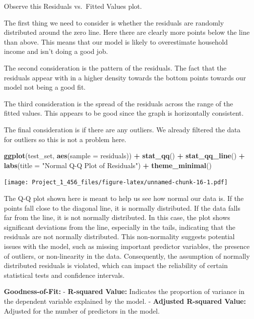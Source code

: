 \documentclass[
]{article}
\newenvironment{Shaded}{\begin{snugshade}}{\end{snugshade}}
\newcommand{\AttributeTok}[1]{\textcolor[rgb]{0.13,0.29,0.53}{#1}}
\newcommand{\FunctionTok}[1]{\textcolor[rgb]{0.13,0.29,0.53}{\textbf{#1}}}
\newcommand{\NormalTok}[1]{#1}
\newcommand{\SpecialCharTok}[1]{\textcolor[rgb]{0.81,0.36,0.00}{\textbf{#1}}}
\newcommand{\StringTok}[1]{\textcolor[rgb]{0.31,0.60,0.02}{#1}}
\begin{document}
Observe this Residuals vs.~Fitted Values plot.

The first thing we need to consider is whether the residuals are
randomly distributed around the zero line. Here there are clearly more
points below the line than above. This means that our model is likely to
overestimate household income and isn't doing a good job.

The second consideration is the pattern of the residuals. The fact that
the residuals appear with in a higher density towards the bottom points
towards our model not being a good fit.

The third consideration is the spread of the residuals across the range
of the fitted values. This appears to be good since the graph is
horizontally consistent.

The final consideration is if there are any outliers. We already
filtered the data for outliers so this is not a problem here.

\begin{Shaded}
\begin{Highlighting}[]
\FunctionTok{ggplot}\NormalTok{(test\_set, }\FunctionTok{aes}\NormalTok{(}\AttributeTok{sample =}\NormalTok{ residuals)) }\SpecialCharTok{+}
  \FunctionTok{stat\_qq}\NormalTok{() }\SpecialCharTok{+}
  \FunctionTok{stat\_qq\_line}\NormalTok{() }\SpecialCharTok{+}
  \FunctionTok{labs}\NormalTok{(}\AttributeTok{title =} \StringTok{"Normal Q{-}Q Plot of Residuals"}\NormalTok{) }\SpecialCharTok{+}
  \FunctionTok{theme\_minimal}\NormalTok{()}
\end{Highlighting}
\end{Shaded}

\texttt{[image: Project\_1\_456\_files/figure-latex/unnamed-chunk-16-1.pdf]}

The Q-Q plot shown here is meant to help us see how normal our data is.
If the points fall close to the diagonal line, it is normally
distributed. If the data falls far from the line, it is not normally
distributed. In this case, the plot shows significant deviations from
the line, especially in the tails, indicating that the residuals are not
normally distributed. This non-normality suggests potential issues with
the model, such as missing important predictor variables, the presence
of outliers, or non-linearity in the data. Consequently, the assumption
of normally distributed residuals is violated, which can impact the
reliability of certain statistical tests and confidence intervals.

\textbf{Goodness-of-Fit:} - \textbf{R-squared Value:} Indicates the
proportion of variance in the dependent variable explained by the model.
- \textbf{Adjusted R-squared Value:} Adjusted for the number of
predictors in the model.
\end{document}
